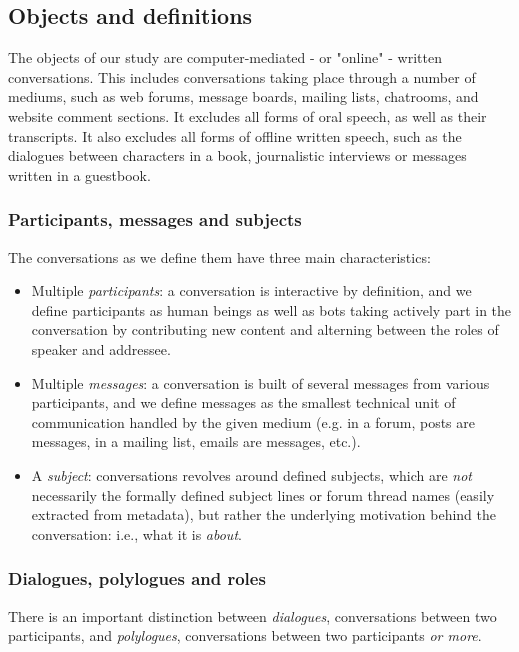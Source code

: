 \subsection{Objects and definitions}

The objects of our study are computer-mediated - or "online" - written conversations. This includes conversations taking place through a number of mediums, such as web forums, message boards, mailing lists, chatrooms, and website comment sections. It excludes all forms of oral speech, as well as their transcripts. It also excludes all forms of offline written speech, such as the dialogues between characters in a book, journalistic interviews or messages written in a guestbook. 

\subsubsection{Participants, messages and subjects}

The conversations as we define them have three main characteristics:

\begin{itemize}
	\item Multiple \textit{participants}: a conversation is interactive by definition, and we define participants as human beings as well as bots taking actively part in the conversation by contributing new content and alterning between the roles of speaker and addressee.
	\item Multiple \textit{messages}: a conversation is built of several messages from various participants, and we define messages as the smallest technical unit of communication handled by the given medium (e.g. in a forum, posts are messages, in a mailing list, emails are messages, etc.).
	\item A \textit{subject}: conversations revolves around defined subjects, which are \textit{not} necessarily the formally defined subject lines or forum thread names (easily extracted from metadata), but rather the underlying motivation behind the conversation: i.e., what it is \textit{about}.
\end{itemize}

\subsubsection{Dialogues, polylogues and roles}

There is an important distinction between \textit{dialogues}, conversations between two participants, and \textit{polylogues}, conversations between two participants \textit{or more}.

